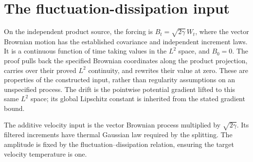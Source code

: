 \documentclass[11pt,a4paper]{article}
\begin{document}
\section{\texorpdfstring{The fluctuation-dissipation input}{The fluctuation-dissipation input}}


On the independent product source, the forcing is \(B_t=\sqrt{2\gamma}\,W_t\), where the vector Brownian motion has the established covariance and independent increment laws. It is a continuous function of time taking values in the \(L^{2}\) space, and \(B_0=0\). The proof pulls back the specified Brownian coordinates along the product projection, carries over their proved \(L^{2}\) continuity, and rewrites their value at zero. These are properties of the constructed input, rather than regularity assumptions on an unspecified process. The drift is the pointwise potential gradient lifted to this same \(L^{2}\) space; its global Lipschitz constant is inherited from the stated gradient bound.



The additive velocity input is the vector Brownian process multiplied by \(\sqrt{2\gamma}\). Its filtered increments have thermal Gaussian law required by the splitting. The amplitude is fixed by the fluctuation–dissipation relation, ensuring the target velocity temperature is one.
\end{document}
